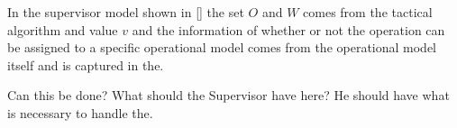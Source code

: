 In the supervisor model shown in \ref{} the set $O$ and $W$ comes from the tactical algorithm
and value $v$ and the information of whether or not the operation can be assigned to a 
specific operational model comes from the operational model itself and is captured in the.

Can this be done? What should the Supervisor have here? He should have what is necessary to
handle the. 
